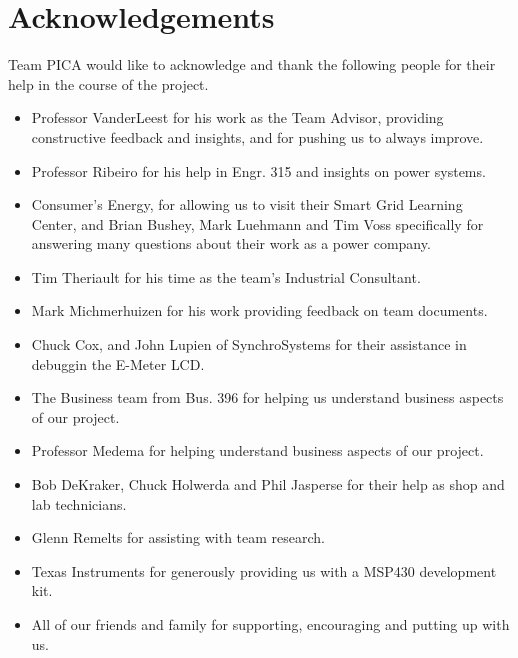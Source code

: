 \section{Acknowledgements}
Team PICA would like to acknowledge and thank the following people for their help in the course of the project.
\begin{itemize}
\item Professor VanderLeest for his work as the Team Advisor, providing constructive feedback and insights, and for pushing us to always improve.
\item Professor Ribeiro for his help in Engr. 315 and insights on power systems.
\item Consumer's Energy, for allowing us to visit their Smart Grid Learning Center, and Brian Bushey, Mark Luehmann and Tim Voss specifically for answering many questions about their work as a power company. 
\item Tim Theriault for his time as the team's Industrial Consultant.
\item Mark Michmerhuizen for his work providing feedback on team documents.
\item Chuck Cox, and John Lupien of SynchroSystems for their assistance in debuggin the E-Meter \ac{LCD}.
\item The Business team from Bus. 396 for helping us understand business aspects of our project.
\item Professor Medema for helping understand business aspects of our project.
\item Bob DeKraker, Chuck Holwerda and Phil Jasperse for their help as shop and lab technicians.
\item Glenn Remelts for assisting with team research.
\item Texas Instruments for generously providing us with a MSP430 development kit. 
\item All of our friends and family for supporting, encouraging and putting up with us. 
\end{itemize}
